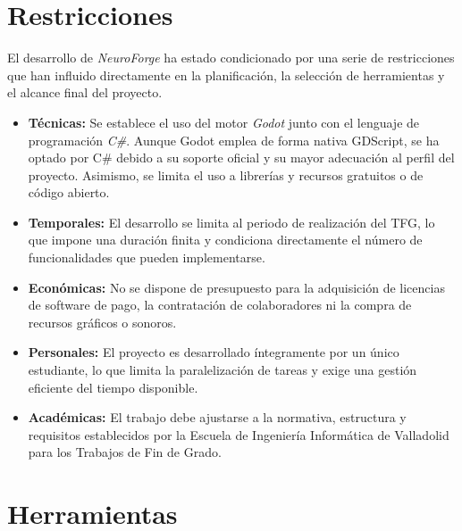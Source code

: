 \section{Restricciones}

El desarrollo de \textit{NeuroForge} ha estado condicionado por una serie
de restricciones que han influido directamente en la planificación, la
selección de herramientas y el alcance final del proyecto.

\begin{itemize}
	
	\item \textbf{Técnicas:} Se establece el uso del motor \textit{Godot} junto con el lenguaje de programación \textit{C\#}. Aunque Godot emplea de forma nativa GDScript, se ha optado por C\# debido a su soporte oficial y su mayor adecuación al perfil del proyecto. Asimismo, se limita el uso a librerías y recursos gratuitos o de código abierto.
	
	\item \textbf{Temporales:} El desarrollo se limita al periodo de realización del TFG, lo que impone una duración finita y condiciona directamente el número de funcionalidades que pueden implementarse.
	
	\item \textbf{Económicas:} No se dispone de presupuesto para la adquisición de licencias de software de pago, la contratación de colaboradores ni la compra de recursos gráficos o sonoros.
	
	\item \textbf{Personales:} El proyecto es desarrollado íntegramente por un único estudiante, lo que limita la paralelización de tareas y exige una gestión eficiente del tiempo disponible.
	
	\item \textbf{Académicas:} El trabajo debe ajustarse a la normativa, estructura y requisitos establecidos por la Escuela de Ingeniería Informática de Valladolid para los Trabajos de Fin de Grado.
	
\end{itemize}

\section{Herramientas}

